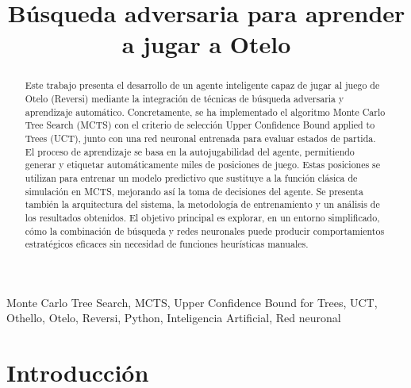 \documentclass[conference]{IEEEtran}
\begin{document}
\title{Búsqueda adversaria para aprender a jugar a Otelo}

\author{
    \and
}

\maketitle

\begin{abstract}
Este trabajo presenta el desarrollo de un agente inteligente capaz de jugar al juego de Otelo (Reversi) mediante la integración de técnicas de búsqueda adversaria y aprendizaje automático. Concretamente, se ha implementado el algoritmo Monte Carlo Tree Search (MCTS) con el criterio de selección Upper Confidence Bound applied to Trees (UCT), junto con una red neuronal entrenada para evaluar estados de partida. El proceso de aprendizaje se basa en la autojugabilidad del agente, permitiendo generar y etiquetar automáticamente miles de posiciones de juego. Estas posiciones se utilizan para entrenar un modelo predictivo que sustituye a la función clásica de simulación en MCTS, mejorando así la toma de decisiones del agente. Se presenta también la arquitectura del sistema, la metodología de entrenamiento y un análisis de los resultados obtenidos. El objetivo principal es explorar, en un entorno simplificado, cómo la combinación de búsqueda y redes neuronales puede producir comportamientos estratégicos eficaces sin necesidad de funciones heurísticas manuales.
\end{abstract}

\begin{IEEEkeywords}
Monte Carlo Tree Search, MCTS, Upper Confidence Bound for Trees, UCT, Othello, Otelo, Reversi, Python, Inteligencia Artificial, Red neuronal
\end{IEEEkeywords}

\section{Introducción}
\end{document}
